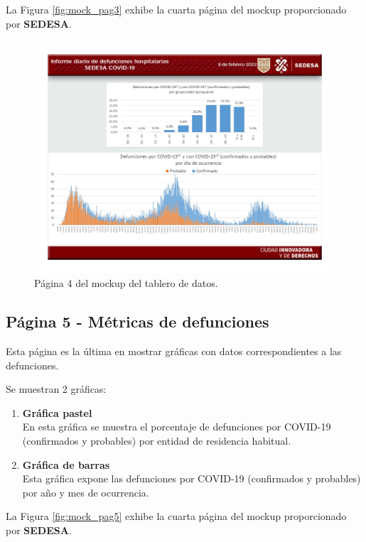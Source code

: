 La Figura \ref{fig:mock_pag3} exhibe la cuarta página del mockup proporcionado por \textbf{SEDESA}.

\begin{figure}[H]
        \centering
        \includegraphics[width=\textwidth]{images/mockup_4.jpg}
        \caption{Página 4 del mockup del tablero de datos.} \label{fig:mock_pag4}
\end{figure}

\subsection{Página 5 - Métricas de defunciones}

Esta página es la última en mostrar gráficas con datos correspondientes a las defunciones.

Se muestran 2 gráficas:

\begin{enumerate}
    \item \textbf{Gráfica pastel}\\
    En esta gráfica se muestra el porcentaje de defunciones por COVID-19 (confirmados y probables) por entidad de residencia habitual.

    \item \textbf{Gráfica de barras}\\
    Esta gráfica expone las defunciones por COVID-19 (confirmados y probables) por año y mes de ocurrencia.
\end{enumerate}

\newpage

La Figura \ref{fig:mock_pag5} exhibe la cuarta página del mockup proporcionado por \textbf{SEDESA}.

